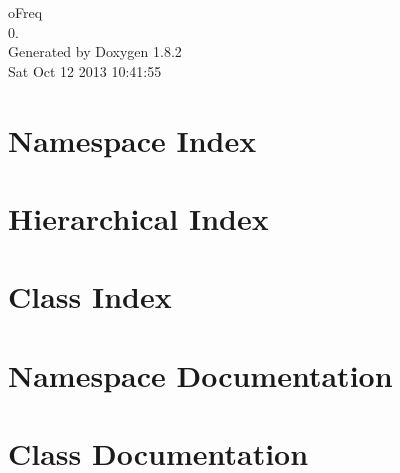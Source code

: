\documentclass{book}
\begin{document}
\hypersetup{pageanchor=false,citecolor=blue}
\begin{titlepage}
\vspace*{7cm}
\begin{center}
{\Large o\-Freq \\[1ex]\large 0. }\\
\vspace*{1cm}
{\large Generated by Doxygen 1.8.2}\\
\vspace*{0.5cm}
{\small Sat Oct 12 2013 10:41:55}\\
\end{center}
\end{titlepage}
\clearemptydoublepage
{}
\tableofcontents
\clearemptydoublepage
{}
\hypersetup{pageanchor=true,citecolor=blue}
\chapter{Namespace Index}

\chapter{Hierarchical Index}

\chapter{Class Index}

\chapter{Namespace Documentation}


\chapter{Class Documentation}

































\printindex
\end{document}
